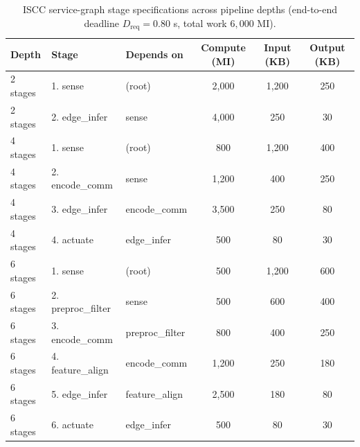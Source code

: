 \begin{table}
\centering
\small
\caption{ISCC service-graph stage specifications across pipeline depths (end-to-end deadline $D_{\text{req}} = 0.80$ s, total work $6{,}000$ MI).}
\label{tab:p5-stages}
\begin{tabular}{lllccc}
\toprule
Depth & Stage & Depends on & Compute (MI) & Input (KB) & Output (KB) \\
\midrule
2 stages & 1. sense & (root) & 2,000 & 1,200 & 250 \\
2 stages & 2. edge\_infer & sense & 4,000 & 250 & 30 \\
4 stages & 1. sense & (root) & 800 & 1,200 & 400 \\
4 stages & 2. encode\_comm & sense & 1,200 & 400 & 250 \\
4 stages & 3. edge\_infer & encode\_comm & 3,500 & 250 & 80 \\
4 stages & 4. actuate & edge\_infer & 500 & 80 & 30 \\
6 stages & 1. sense & (root) & 500 & 1,200 & 600 \\
6 stages & 2. preproc\_filter & sense & 500 & 600 & 400 \\
6 stages & 3. encode\_comm & preproc\_filter & 800 & 400 & 250 \\
6 stages & 4. feature\_align & encode\_comm & 1,200 & 250 & 180 \\
6 stages & 5. edge\_infer & feature\_align & 2,500 & 180 & 80 \\
6 stages & 6. actuate & edge\_infer & 500 & 80 & 30 \\
\bottomrule
\end{tabular}
\end{table}
